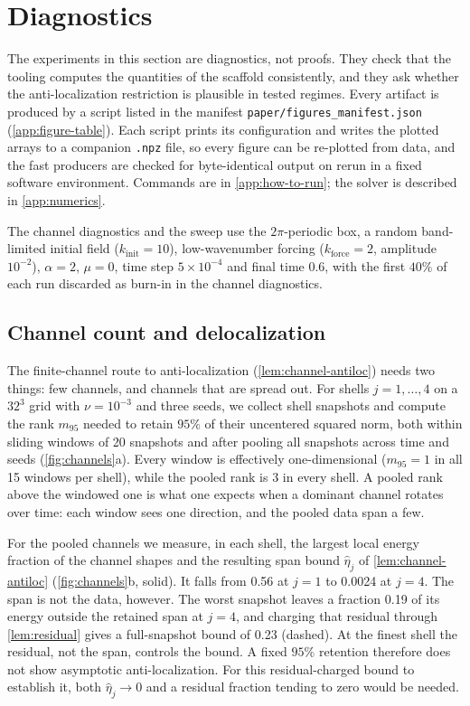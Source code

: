 \section{Diagnostics}
\label{sec:experiments}

The experiments in this section are diagnostics, not proofs. They check that the tooling computes
the quantities of the scaffold consistently, and they ask whether the anti-localization
restriction is plausible in tested regimes. Every artifact is produced by a script listed in the
manifest \nolinkurl{paper/figures_manifest.json} (\cref{app:figure-table}). Each script prints its
configuration and writes the plotted arrays to a companion \texttt{.npz} file, so every figure can be
re-plotted from data, and the fast producers are checked for byte-identical output on rerun in a
fixed software environment. Commands are in \cref{app:how-to-run}; the solver is described in
\cref{app:numerics}.

The channel diagnostics and the sweep use the $2\pi$-periodic box, a random band-limited initial field
($k_{\mathrm{init}}=10$), low-wavenumber forcing ($k_{\mathrm{force}}=2$, amplitude $10^{-2}$),
$\alpha=2$, $\mu=0$, time step $5\times10^{-4}$ and final time $0.6$, with the first $40\%$ of each run
discarded as burn-in in the channel diagnostics.

\subsection{Channel count and delocalization}

The finite-channel route to anti-localization (\cref{lem:channel-antiloc}) needs two things: few
channels, and channels that are spread out. For shells $j=1,\dots,4$ on a $32^3$ grid with
$\nu=10^{-3}$ and three seeds, we collect shell snapshots and compute the rank $m_{95}$ needed to
retain $95\%$ of their uncentered squared norm, both within sliding windows of 20 snapshots and
after pooling all snapshots across time and seeds (\cref{fig:channels}a). Every window is
effectively one-dimensional ($m_{95}=1$ in all 15 windows per shell), while the pooled rank is
3 in every shell. A pooled rank above the windowed one is what one expects when a dominant channel rotates
over time: each window sees one direction, and the pooled data span a few.

For the pooled channels we measure, in each shell, the largest local energy fraction of the channel
shapes and the resulting span bound $\hat\eta_j$ of \cref{lem:channel-antiloc}
(\cref{fig:channels}b, solid). It falls from 0.56 at $j=1$ to 0.0024 at $j=4$. The span is not
the data, however. The worst snapshot leaves a fraction 0.19 of its energy outside the
retained span at $j=4$, and charging that residual through \cref{lem:residual} gives a
full-snapshot bound of 0.23 (dashed). At the finest shell the residual, not the span,
controls the bound. A fixed $95\%$ retention therefore does not show asymptotic anti-localization. For this
residual-charged bound to establish it, both $\hat\eta_j\to0$ and a residual fraction tending to zero
would be needed.

